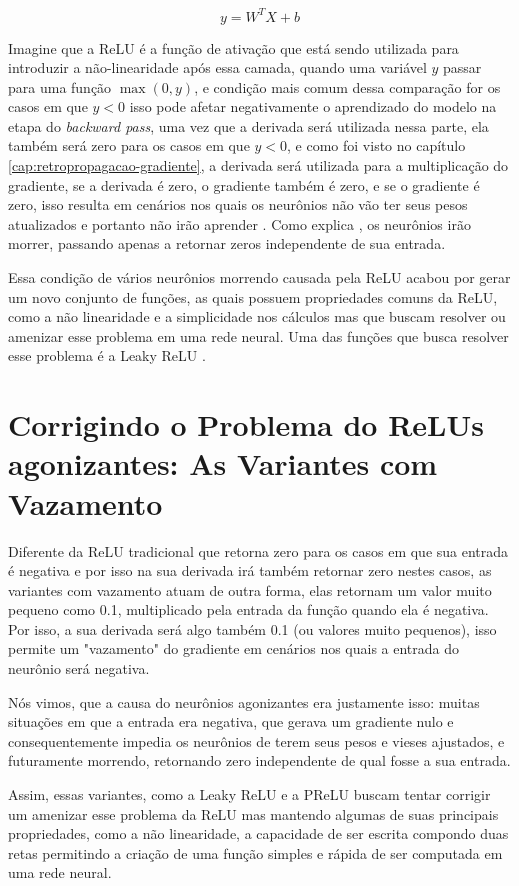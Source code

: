 \[
    y = W^T  X + b
\]

Imagine que a ReLU é a função de ativação que está sendo utilizada para introduzir a não-linearidade após essa camada, quando uma variável $y$ passar para uma função $\max(0, y)$, e condição mais comum dessa comparação for os casos em que $y < 0$ isso pode afetar negativamente o aprendizado do modelo na etapa do \textit{backward pass}, uma vez que a derivada será utilizada nessa parte, ela também será zero para os casos em que $y < 0$, e como foi visto no capítulo \ref{cap:retropropagacao-gradiente}, a derivada será utilizada para a multiplicação do gradiente, se a derivada é zero, o gradiente também é zero, e se o gradiente é zero, isso resulta em cenários nos quais os neurônios não vão ter seus pesos atualizados e portanto não irão aprender \parencite{DyingReluDouglas}. Como explica \textcite{DyingReluDouglas}, os neurônios irão morrer, passando apenas a retornar zeros independente de sua entrada.

Essa condição de vários neurônios morrendo causada pela ReLU acabou por gerar um novo conjunto de funções, as quais possuem propriedades comuns da ReLU, como a não linearidade e a simplicidade nos cálculos mas que buscam resolver ou amenizar esse problema em uma rede neural. Uma das funções que busca resolver esse problema é a Leaky ReLU \parencite{DyingReluDouglas}.

\section{Corrigindo o Problema do ReLUs agonizantes: As Variantes com Vazamento}

Diferente da ReLU tradicional que retorna zero para os casos em que sua entrada é negativa e por isso na sua derivada irá também retornar zero nestes casos, as variantes com vazamento atuam de outra forma, elas retornam um valor muito pequeno como 0.1, multiplicado pela entrada da função quando ela é negativa. Por isso, a sua derivada será algo também 0.1 (ou valores muito pequenos), isso permite um "vazamento" do gradiente em cenários nos quais a entrada do neurônio será negativa.

Nós vimos, que a causa do neurônios agonizantes era justamente isso: muitas situações em que a entrada era negativa, que gerava um gradiente nulo e consequentemente impedia os neurônios de terem seus pesos e vieses ajustados, e futuramente morrendo, retornando zero independente de qual fosse a sua entrada.

Assim, essas variantes, como a Leaky ReLU e a PReLU buscam tentar corrigir um amenizar esse problema da ReLU mas mantendo algumas de suas principais propriedades, como a não linearidade, a capacidade de ser escrita compondo duas retas permitindo a criação de uma função simples e rápida de ser computada em uma rede neural.

